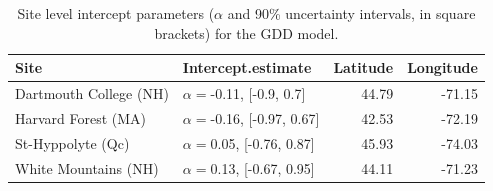 \documentclass{article}\usepackage[]{graphicx}\usepackage[]{xcolor}
\begin{document}
\begin{table}[ht]
\centering
\begin{tabular}{llrr}
  \hline
Site & Intercept.estimate & Latitude & Longitude \\ 
  \hline
Dartmouth College (NH) & $\alpha = $-0.11, [-0.9, 0.7] & 44.79 & -71.15 \\ 
  Harvard Forest (MA) & $\alpha = $-0.16, [-0.97, 0.67] & 42.53 & -72.19 \\ 
  St-Hyppolyte (Qc) & $\alpha = $0.05, [-0.76, 0.87] & 45.93 & -74.03 \\ 
  White Mountains (NH) & $\alpha = $0.13, [-0.67, 0.95] & 44.11 & -71.23 \\ 
   \hline
\end{tabular}
\caption{Site level intercept parameters ($\alpha$ and 90\% uncertainty intervals, in square brackets) for the GDD model.} 
\label{tab:wc_asite_table}
\end{table}
\end{document}
